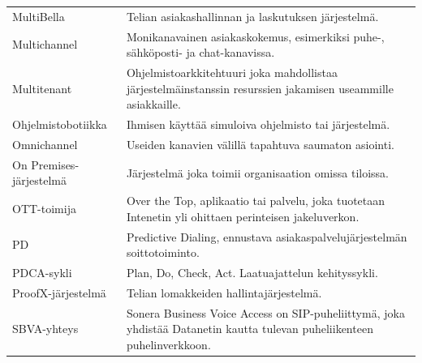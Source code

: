 \documentclass[finnish,12pt,a4paper,pdftex]{article}
\begin{document}
\begin{table}[h!]
\centering
\label{my-label}

\begin{tabular}{ p{5cm}  p{\textwidth-6cm} }

MultiBella                  & Telian asiakashallinnan ja laskutuksen järjestelmä.                                                                                               \\[0.9em]
Multichannel                & Monikanavainen asiakaskokemus, esimerkiksi puhe-, sähköposti- ja chat-kanavissa.                                                                 \\[0.9em]
Multitenant                 & Ohjelmistoarkkitehtuuri joka mahdollistaa järjestelmäinstanssin resurssien jakamisen useammille asiakkaille.                                     \\[0.9em]
Ohjelmistobotiikka          & Ihmisen käyttää simuloiva ohjelmisto tai järjestelmä.                                                                                            \\[0.9em]
Omnichannel                 & Useiden kanavien välillä tapahtuva saumaton asiointi.                                                                                            \\[0.9em]
On Premises-järjestelmä     & Järjestelmä joka toimii organisaation omissa tiloissa.                                                                                           \\[0.9em]
OTT-toimija                 & Over the Top, aplikaatio tai palvelu, joka tuotetaan Intenetin yli ohittaen perinteisen jakeluverkon.                                            \\[0.9em]
PD                          & Predictive Dialing, ennustava asiakaspalvelujärjestelmän soittotoiminto.                                                                         \\[0.9em]
PDCA-sykli                  & Plan, Do, Check, Act. Laatuajattelun kehityssykli.                                                                                               \\[0.9em]
ProofX-järjestelmä          & Telian lomakkeiden hallintajärjestelmä.                                                                                                          \\[0.9em]
SBVA-yhteys                 & Sonera Business Voice Access on SIP-puheliittymä, joka yhdistää Datanetin kautta tulevan puheliikenteen puhelinverkkoon.                         \\[0.9em]

\end{tabular}
\end{table}
\end{document}
